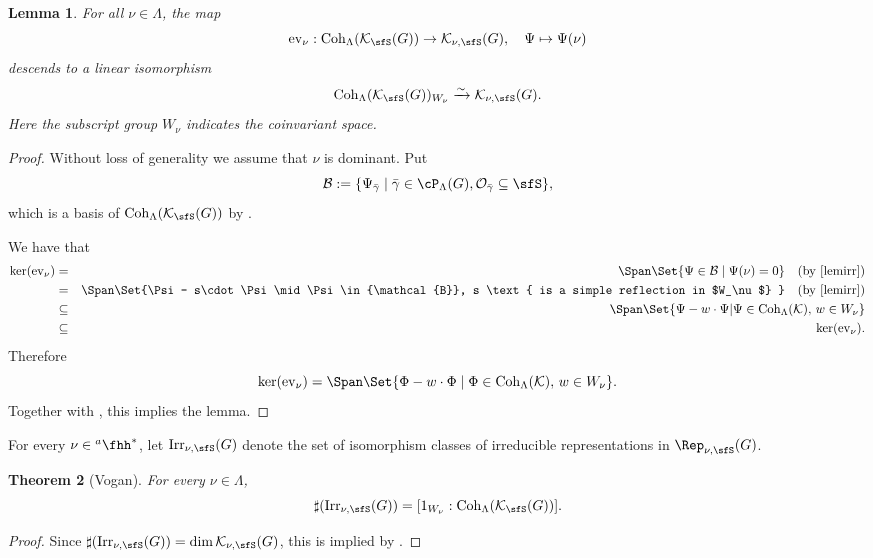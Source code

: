\documentclass[12pt,a4paper]{amsart}
\newcommand{\BS}{{\mathbb {S}}}
\newcommand{\CB}{{\mathcal {B}}}
\newcommand{\CK}{{\mathcal {K}}}
\newcommand{\CO}{{\mathcal {O}}}
\numberwithin{equation}{section}
\newtheorem{thm}{Theorem}[section]
\newtheorem{lem}[thm]{Lemma}
\theoremstyle{remark}
\def\Irr{\mathrm{Irr}}
\def\hha{{}^a\fhh}
\def\Coh{\mathrm{Coh}}
\def\ev#1{{\mathrm{ev}_{#1}}}
\newcommand{\Grt}{\cK}
\begin{document}
\begin{lem}\label{prop:ev00000}
  For all $\nu\in \Lambda$, the map
  \[
   \mathrm{ev}_\nu:  \Coh_{\Lambda}(\CK_\sfS(G))\rightarrow \CK_{\nu, \sfS}(G), \quad \Psi\mapsto \Psi(\nu)
  \]
  descends to a linear isomorphism
  \[
     \Coh_{\Lambda}(\CK_\sfS(G))_{W_{\nu}} \xrightarrow{\sim}\CK_{\nu, \sfS}(G).
  \]
  Here the subscript group $W_{\nu}$ indicates the coinvariant space. \end{lem}
\begin{proof}
  \def\BS{\cB_{\cS}} Without loss of generality we assume that $\nu$ is
  dominant. Put
  \[
    \CB:=\{\Psi_{\bar \gamma}\mid \bar \gamma\in \cP_\Lambda(G), \CO_{\bar \gamma}\subseteq \sfS \},
  \]
  which is a basis of  $\Coh_{\Lambda}(\CK_\sfS(G))$ by .

  We have that
  \begin{eqnarray*}
    \ker (\ev{\nu})& = & \Span \Set{\Psi\in \CB \mid
                                        \Psi(\nu)= 0 }\quad (\textrm{by \Cref{lemirr}}) \\
    &=& \Span \Set{\Psi - s\cdot\Psi \mid
                                        \Psi\in  \CB,
                                           s  \text{ is a simple reflection in $W_\nu$}
                                        } \quad (\textrm{by \Cref{lemirr}})\\
                          & \subseteq &\Span\Set{\Psi- w\cdot \Psi | \Psi\in  \Coh_{\Lambda}(\CK), \, w\in W_{\nu}} \\
                          &  \subseteq &  \ker (\ev{\nu}). %
  \end{eqnarray*}
Therefore
  \[
    \ker (\ev{\nu})=\Span\Set{\Phi- w \cdot\Phi \mid \Phi\in \Coh_{\Lambda}(\CK), \, w\in W_\nu}.
  \]
Together with , this implies the lemma.
\end{proof}



For every $\nu\in \hha^*$, let $\Irr_{\nu,\sfS}(G)$ denote the set of isomorphism classes of irreducible representations in $\Rep_{\nu, \sfS}(G)$.


\begin{thm}[Vogan]\label{count1}
 For every $\nu\in \Lambda$,
  \[
    \sharp(\Irr_{\nu,\sfS}(G)) = [1_{W_{\nu}}:\Coh_{\Lambda}(\CK_\sfS(G))].
  \]

\end{thm}
\begin{proof}
Since $ \sharp(\Irr_{\nu,\sfS}(G))=\dim \CK_{\nu, \sfS}(G)$, this is implied by .

\end{proof}
\end{document}
